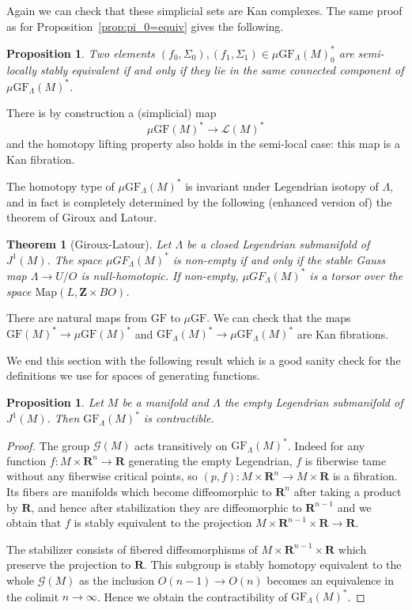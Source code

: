 \documentclass[12pt,a4paper]{article}
\numberwithin{equation}{section}
\newtheorem{thm}[equation]{Theorem}
\newtheorem{prop}[equation]{Proposition}
\theoremstyle{definition}
\theoremstyle{remark}
\newcommand{\Z}{\mathbf{Z}}
\newcommand{\R}{\mathbf{R}}
\newcommand{\LL}{\mathcal{L}}
\newcommand{\Map}{\mathrm{Map}}
\newcommand{\G}{\mathcal{G}}
\newcommand{\GF}{\mathrm{GF}}
\begin{document}
Again we can check that these simplicial sets are Kan complexes. The same proof as for Proposition~\ref{prop:pi_0=equiv}
gives the following.

\begin{prop}
Two elements $(f_0,\Sigma_0),(f_1,\Sigma_1)\in \mu\GF_\Lambda(M)^*_0$ are semi-locally stably equivalent if and only if they
lie in the same connected component of $\mu \GF_\Lambda(M)^*$.
\end{prop}

There is by construction a (simplicial) map
\[\mu\GF(M)^* \to \LL(M)^*\]
and the homotopy lifting property also holds in the semi-local case: this map is a Kan fibration.

The homotopy type of $\mu \GF_\Lambda(M)^*$ is invariant under Legendrian isotopy of $\Lambda$, and in fact
is completely determined by the following (enhanced version of) the theorem of Giroux and Latour.

\begin{thm}[Giroux-Latour]\label{thm:spacelevelgiroux-latour}
Let $\Lambda$ be a closed Legendrian submanifold of $J^1(M)$. The space $\mu GF_\Lambda(M)^*$
is non-empty if and only if the stable Gauss map $\Lambda \to U/O$ is null-homotopic. If non-empty,
$\mu GF_\Lambda(M)^*$ is a torsor over the space $\Map(L, \Z\times BO)$.
\end{thm}

There are natural maps from $\GF$ to $\mu\GF$. We can check that
the maps $\GF(M)^* \to \mu\GF(M)^*$ and $\GF_\Lambda(M)^*\to \mu \GF_\Lambda(M)^*$ are Kan fibrations.

We end this section with the following result which is a good sanity check for the definitions we use for spaces of generating functions.

\begin{prop}\label{prop:emptyleg}
Let $M$ be a manifold and $\Lambda$ the empty Legendrian submanifold of $J^1(M)$. Then $\GF_\Lambda(M)^*$ is contractible.
\end{prop}
\begin{proof}
The group $\G(M)$ acts transitively on $\GF_\Lambda(M)^*$. Indeed for any function $f:M\times \R^n\to \R$
generating the empty Legendrian, $f$ is fiberwise tame without any fiberwise critical points, so $(p,f):M\times \R^n \to M \times \R$ is a fibration. Its fibers are manifolds which become diffeomorphic to $\R^n$ after taking a product by $\R$, and hence after stabilization they are diffeomorphic to
$\R^{n-1}$ and we obtain that $f$ is stably equivalent to the projection $M\times \R^{n-1}\times \R \to \R$.

The stabilizer consists of fibered diffeomorphisms of $M\times \R^{n-1} \times \R$
which preserve the projection to $\R$. This subgroup is stably homotopy equivalent to the whole $\G(M)$ as the inclusion $O(n-1)\to O(n)$
becomes an equivalence in the colimit $n\to \infty$. Hence we obtain the contractibility of $\GF_\Lambda(M)^*$.
\end{proof}
\end{document}
